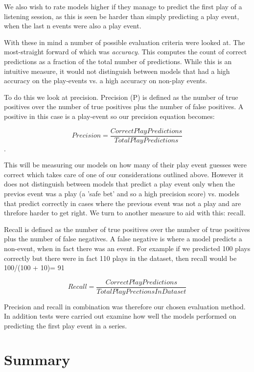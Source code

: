 We also wish to rate models higher if they manage to predict the first play of a listening session, as this is seen be harder than simply predicting a play event, when the last n events were also a play event.

With these in mind a number of possible evaluation criteria were looked at. The most-straight forward of which was \textit{accuracy}. This computes the count of correct predictions as a fraction of the total number of predictions. While this is an intuitive measure, it would not distinguish between models that had a high accuracy on the play-events vs. a high accuracy on non-play events. 

To do this we look at precision. Precision (P) is defined as the number of true positives over the number of true positives plus the number of false positives. A positive in this case is a play-event so our precision equation becomes:

$$Precision = \frac{Correct Play Predictions}{Total Play Predictions}$$. 

This will be measuring our models on how many of their play event guesses were correct which takes care of one of our considerations outlined above. However it does not distinguish between models that predict a play event only when the previos event was a play (a 'safe bet' and so a high precision score) vs. models that predict correctly in cases where the previous event was not a play and are threfore harder to get right. We turn to another measure to aid with this: recall.

Recall is defined as the number of true positives over the number of true positives plus the number of false negatives. A false negative is where a model predicts a non-event, when in fact there was an event. For example if we predicted 100 plays correctly but there were in fact 110 plays in the dataset, then recall would be 100/(100 + 10)= 91%

$$Recall = \frac{CorrectPlayPredictions}{TotalPlayPrectionsInDataset}$$

Precision and recall in combination was therefore our chosen evaluation method. In addition tests were carried out examine how well the models performed on predicting the first play event in a series.



\section{Summary}

